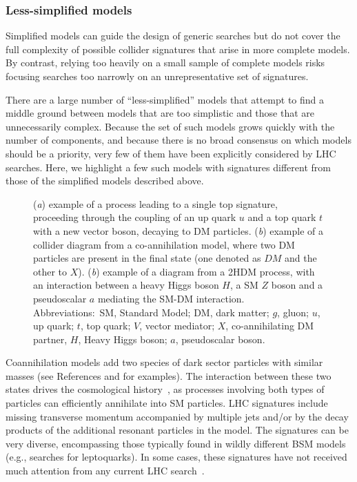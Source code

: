 \documentclass{ar-1col}
\begin{document}
\subsubsection{Less-simplified models}\label{sec:LessSimplifiedModels}

Simplified models can guide the design of generic searches but do
not cover the full complexity of possible collider signatures that
arise in more complete models. By contrast, relying too
heavily on a small sample of complete models risks focusing
searches too narrowly on an unrepresentative set of signatures.

There are a large number of ``less-simplified'' models that
attempt to find a middle ground between models that are too
simplistic and those that are unnecessarily complex. Because the
set of such models grows quickly with the number of components,
and because there is no broad consensus on which models should be a
priority, very few of them have been explicitly considered by LHC
searches. Here, we highlight a few such models with signatures different from those of
 the simplified models described above.

\begin{figure}[!htpb]
\caption{
(\textit{a}) example of a process leading to a single top signature, proceeding through the coupling of an up quark $u$ and a top quark $t$ with a new vector boson, decaying to DM particles. 
(\textit{b}) example of a collider diagram from a co-annihilation model, where two DM particles are present in the final state (one denoted as $DM$ and the other to $X$). 
(\textit{b}) example of a diagram from a 2HDM process, with an interaction between a heavy Higgs boson $H$, a SM $Z$ boson and a  pseudoscalar $a$ mediating the SM-DM interaction. 
Abbreviations:\ SM, Standard Model; DM, dark matter; $g$, gluon; $u$, up quark; $t$, top quark; $V$, vector mediator; $X$, co-annihilating DM partner, $H$, Heavy Higgs boson; $a$, pseudoscalar boson.}
\label{fig:feynman_2}
\end{figure}

{Coannihilation} models add two species of dark sector
particles with similar masses (see References  and  for examples). The interaction
between these two states drives the cosmological
history~\cite{Ellis:1999mm}, as processes involving both types of
particles can efficiently annihilate into SM particles. LHC
signatures include missing transverse momentum accompanied by multiple jets
and/or by the decay products of the 
additional resonant particles in the model.
The signatures can be very diverse, encompassing those typically
found in wildly different BSM models (e.g., searches for
leptoquarks). In some cases, these signatures have not received much attention from any
current LHC search~\cite{Buschmann:2016hkc}.
\end{document}
